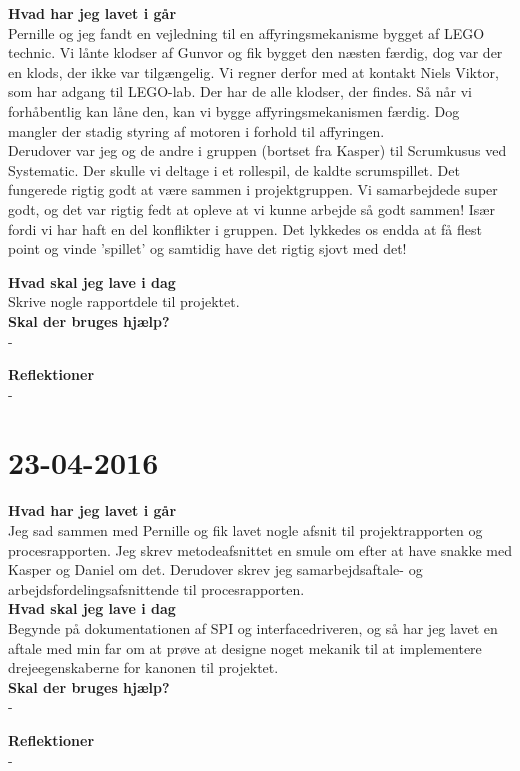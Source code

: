 \documentclass{article}
\begin{document}
	\textbf{Hvad har jeg lavet i går}\\
	Pernille og jeg fandt en vejledning til en affyringsmekanisme bygget af LEGO technic. Vi lånte klodser af Gunvor og fik bygget den næsten færdig, dog var der en klods, der ikke var tilgængelig. Vi regner derfor med at kontakt Niels Viktor, som har adgang til LEGO-lab. Der har de alle klodser, der findes. Så når vi forhåbentlig kan låne den, kan vi bygge affyringsmekanismen færdig. Dog mangler der stadig styring af motoren i forhold til affyringen.\\
	Derudover var jeg og de andre i gruppen (bortset fra Kasper) til Scrumkusus ved Systematic. Der skulle vi deltage i et rollespil, de kaldte scrumspillet. Det fungerede rigtig godt at være sammen i projektgruppen. Vi samarbejdede super godt, og det var rigtig fedt at opleve at vi kunne arbejde så godt sammen! Især fordi vi har haft en del konflikter i gruppen. Det lykkedes os endda at få flest point og vinde 'spillet' og samtidig have det rigtig sjovt med det!  
	
	\textbf{Hvad skal jeg lave i dag}\\
	Skrive nogle rapportdele til projektet.\\
	
	\textbf{Skal der bruges hjælp?}\\
	-
	
	\textbf{Reflektioner}\\
	-
	
	
	\section{23-04-2016}
	
	\textbf{Hvad har jeg lavet i går}\\
	Jeg sad sammen med Pernille og fik lavet nogle afsnit til projektrapporten og procesrapporten. Jeg skrev metodeafsnittet en smule om efter at have snakke med Kasper og Daniel om det. Derudover skrev jeg samarbejdsaftale- og arbejdsfordelingsafsnittende til procesrapporten.\\ 
	
	\textbf{Hvad skal jeg lave i dag}\\
	Begynde på dokumentationen af SPI og interfacedriveren, og så har jeg lavet en aftale med min far om at prøve at designe noget mekanik til at implementere drejeegenskaberne for kanonen til projektet.\\
	
	\textbf{Skal der bruges hjælp?}\\
	-
	
	\textbf{Reflektioner}\\
	-
	
	
	
\end{document}
